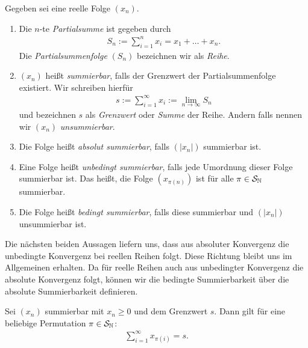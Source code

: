 \begin{df}
	Gegeben sei eine reelle Folge $ (x_n) $.
	\begin{enumerate}[label = (\roman*)]
		\item Die $ n $-te \textit{Partialsumme} ist gegeben durch
		\begin{align*}
			S_n := \sum \limits_{i=1}^n x_i  = x_1 + \dots + x_n.
		\end{align*}
		Die \textit{Partialsummenfolge} $ (S_n) $ bezeichnen wir als \textit{Reihe}.
		
		\item 
		
		$ (x_n) $ heißt \textit{summierbar}, falls der Grenzwert der Partialsummenfolge  existiert. Wir schreiben hierfür
		\begin{align*}
			s:= \sum \limits_{i=1}^\infty x_i := \lim \limits_{n \to \infty}  S_n 
		\end{align*}
		und bezeichnen $ s $ als \textit{Grenzwert} oder \textit{Summe} der Reihe.
		Andern falls nennen wir $ (x_n) $ \textit{unsummierbar}.
		
		\item 
		Die Folge heißt \textit{absolut summierbar}, falls $ (|x_n|)$ summierbar ist.
		
		\item 
		Eine Folge heißt \textit{unbedingt summierbar}, falls jede Umordnung dieser Folge summierbar ist. Das heißt, die Folge $ (x_{\pi(n)}) $ ist für alle
		$ \pi \in \mathcal{S}_{\mathbb{N}} $ summierbar.
%		 
		\item 
		Die Folge heißt \textit{bedingt summierbar}, falls diese summierbar und $ (| x_n |) $ unsummierbar ist.
	\end{enumerate}
\end{df}


Die nächsten beiden Aussagen liefern uns, dass aus absoluter Konvergenz die unbedingte Konvergenz bei reellen Reihen folgt.
Diese Richtung bleibt uns im Allgemeinen erhalten.
Da für reelle Reihen auch aus unbedingter Konvergenz die absolute Konvergenz folgt, können wir die bedingte Summierbarkeit über die absolute Summierbarkeit definieren.
\begin{lem}\label{thm:numerical_series_positiv}
	Sei  $  (x_n) $ summierbar mit $ x_n \geq 0 $ und dem Grenzwert $ s $.
	Dann gilt für eine beliebige Permutation $ \pi \in \mathcal{S}_{\mathbb{N}} $:
	\begin{align*}
	\sum \limits_{i=1}^\infty x_{\pi(i) } = s.
	\end{align*}
\end{lem}


